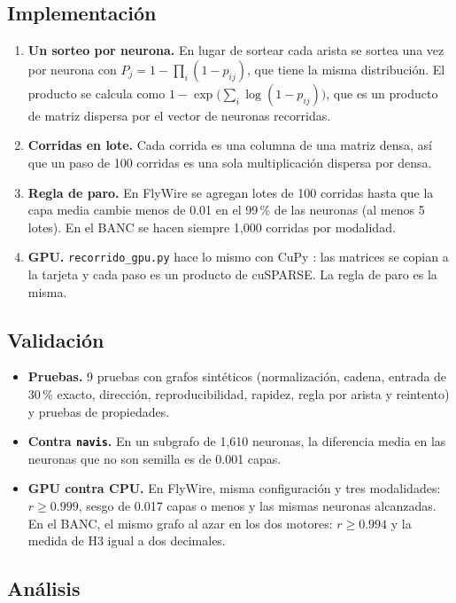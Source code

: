 \documentclass[11pt,letterpaper]{article}
\begin{document}
\subsection{Implementación}

\begin{enumerate}
  \item \textbf{Un sorteo por neurona.} En lugar de sortear cada arista se sortea una vez por neurona con $P_j = 1-\prod_i(1-p_{ij})$, que tiene la misma distribución. El producto se calcula como $1-\exp\!\big(\sum_i \log(1-p_{ij})\big)$, que es un producto de matriz dispersa por el vector de neuronas recorridas.
  \item \textbf{Corridas en lote.} Cada corrida es una columna de una matriz densa, así que un paso de 100 corridas es una sola multiplicación dispersa por densa.
  \item \textbf{Regla de paro.} En FlyWire se agregan lotes de 100 corridas hasta que la capa media cambie menos de 0.01 en el 99\,\% de las neuronas (al menos 5 lotes). En el BANC se hacen siempre 1{,}000 corridas por modalidad.
  \item \textbf{GPU.} \texttt{recorrido\_gpu.py} hace lo mismo con CuPy \citep{cupy}: las matrices se copian a la tarjeta y cada paso es un producto de cuSPARSE. La regla de paro es la misma.
\end{enumerate}

\subsection{Validación}

\begin{itemize}
  \item \textbf{Pruebas.} 9 pruebas con grafos sintéticos (normalización, cadena, entrada de 30\,\% exacto, dirección, reproducibilidad, rapidez, regla por arista y reintento) y pruebas de propiedades.
  \item \textbf{Contra \texttt{navis}.} En un subgrafo de 1{,}610 neuronas, la diferencia media en las neuronas que no son semilla es de 0.001 capas.
  \item \textbf{GPU contra CPU.} En FlyWire, misma configuración y tres modalidades: $r \ge 0.999$, sesgo de 0.017 capas o menos y las mismas neuronas alcanzadas. En el BANC, el mismo grafo al azar en los dos motores: $r \ge 0.994$ y la medida de H3 igual a dos decimales.
\end{itemize}

\subsection{Análisis}
\end{document}
